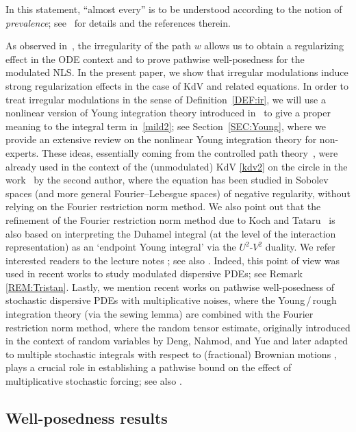 \documentclass[letterpaper, 11pt,  reqno]{amsart}
\newcommand{\1}{\hspace{0.5mm}\text{I}\hspace{0.5mm}}
\numberwithin{equation}{section}
\numberwithin{theorem}{section}
\begin{document}
In this statement, ``almost every'' is to be understood according to the notion of {\it prevalence}; see~\cite{GG} for details and the  references therein.


As observed in~\cite{CatellierGubinelli,CG1}, the irregularity of the path $w$ allows 
us to obtain a regularizing effect in the ODE context and 
to prove pathwise well-posedness for 
the modulated  NLS.
In the present paper, we show that irregular modulations 
induce strong regularization effects 
in the case of  KdV
and related  equations.
In order to treat 
 irregular modulations in the sense of Definition~\ref{DEF:ir},
we will use a nonlinear version of Young integration theory introduced in~\cite{CG1}
to give a proper meaning to the integral term in~\eqref{mild2};
see Section~\ref{SEC:Young}, 
where we provide an extensive review on the nonlinear Young integration theory
for non-experts.
These ideas, essentially coming from the controlled  path theory~\cite{Gub04}, were already used in the context of the (unmodulated)  KdV \eqref{kdv2} on the circle  in the work~\cite{GubinelliKdV} 
by the second author, 
where the equation has been studied in Sobolev spaces (and more general Fourier--Lebesgue spaces) 
of negative regularity, 
without relying on the Fourier restriction norm method.
We also point out that the refinement of the Fourier restriction norm method
due to Koch and Tataru~\cite{KT}
is also based on interpreting the Duhamel integral (at the level of the interaction representation)
as an `endpoint Young integral' via the $U^2$-$V^2$ duality.
We refer interested readers to the lecture notes \cite{Koch};
see also \cite{HHK}.
Indeed, this point of view was used in 
recent works
\cite{Robert2, Robert3}
to study modulated dispersive PDEs;
see Remark \ref{REM:Tristan}.
Lastly, we  mention recent works \cite{CLO2, COZ,  CLOO}
on 
pathwise well-posedness of stochastic dispersive PDEs
with multiplicative noises, 
where 
the Young\,/\,rough integration theory
(via the sewing lemma)
are combined with
the Fourier restriction norm method, 
where the random tensor estimate, 
originally introduced in the context 
of random variables by Deng, Nahmod, and Yue \cite{DNY3}
and later adapted  
to multiple stochastic integrals with respect to (fractional) Brownian motions \cite{OWZ, CLO2}, 
plays a crucial role in establishing a pathwise bound
on the effect of multiplicative stochastic forcing; 
see also \cite{CGLLO2, SLO}. 



\subsection{Well-posedness results}
\end{document}
